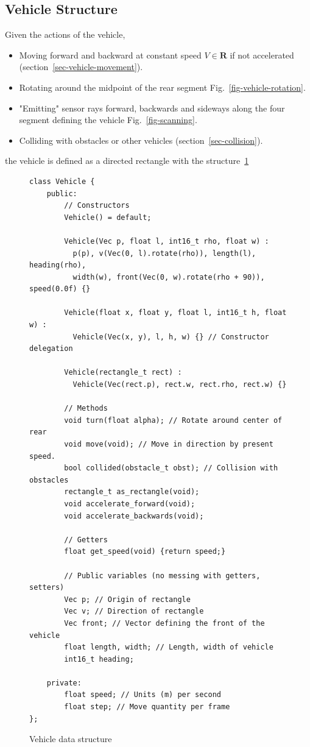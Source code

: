 \documentclass[11pt]{article}
\newcommand{\Rb}{\mathbf{R}}
\newcommand{\figref}[1]{Fig.~\eqref{#1}}
\begin{document}
\subsection{Vehicle Structure}
\label{sec-game-vehicle-structure}

Given the actions of the vehicle,
\begin{itemize}
    \item Moving forward and backward at constant speed $V\in\Rb$ if not accelerated
        (section~\ref{sec-vehicle-movement}).
    \item Rotating around the midpoint of the rear segment
        \figref{fig-vehicle-rotation}.
    \item "Emitting" sensor rays forward, backwards and sideways along the
        four segment defining the vehicle \figref{fig-scanning}.
    \item Colliding with obstacles or other vehicles
        (section~\ref{sec-collision}).
\end{itemize}
the vehicle is defined as a directed rectangle with the
structure~\ref{code-vehicle-data-structure}
\begin{figure}
\begin{verbatim}
class Vehicle {
    public:
        // Constructors
        Vehicle() = default;

        Vehicle(Vec p, float l, int16_t rho, float w) :
          p(p), v(Vec(0, l).rotate(rho)), length(l), heading(rho),
          width(w), front(Vec(0, w).rotate(rho + 90)), speed(0.0f) {}

        Vehicle(float x, float y, float l, int16_t h, float w) :
          Vehicle(Vec(x, y), l, h, w) {} // Constructor delegation

        Vehicle(rectangle_t rect) :
          Vehicle(Vec(rect.p), rect.w, rect.rho, rect.w) {}

        // Methods
        void turn(float alpha); // Rotate around center of rear
        void move(void); // Move in direction by present speed.
        bool collided(obstacle_t obst); // Collision with obstacles
        rectangle_t as_rectangle(void);
        void accelerate_forward(void);
        void accelerate_backwards(void);

        // Getters
        float get_speed(void) {return speed;}

        // Public variables (no messing with getters, setters)
        Vec p; // Origin of rectangle
        Vec v; // Direction of rectangle
        Vec front; // Vector defining the front of the vehicle
        float length, width; // Length, width of vehicle
        int16_t heading;

    private:
        float speed; // Units (m) per second
        float step; // Move quantity per frame
};
\end{verbatim}
\caption{Vehicle data structure}\label{code-vehicle-data-structure}
\end{figure}
\end{document}
